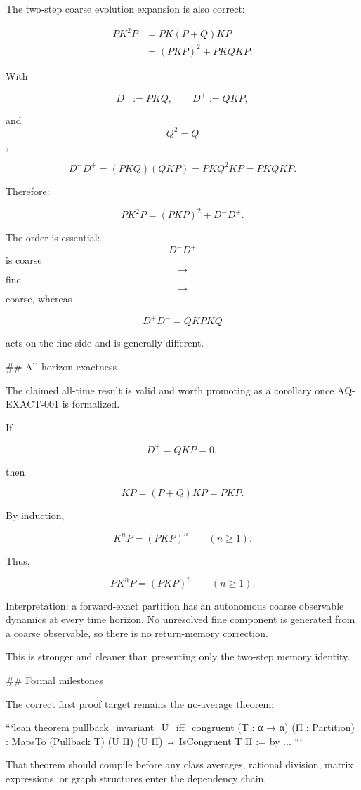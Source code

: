 The two-step coarse evolution expansion is also correct:

$$
\begin{aligned}
PK^2P
&=PK(P+Q)KP\\
&=(PKP)^2+PKQKP.
\end{aligned}
$$

With

$$
D^-:=PKQ,\qquad D^+:=QKP,
$$

and $$Q^2=Q$$,

$$
D^-D^+
=
(PKQ)(QKP)
=
PKQ^2KP
=
PKQKP.
$$

Therefore:

$$
\boxed{
PK^2P=(PKP)^2+D^-D^+.
}
$$

The order is essential: $$D^-D^+$$ is coarse $$\to$$ fine $$\to$$ coarse, whereas

$$
D^+D^-=QKPKQ
$$

acts on the fine side and is generally different.

## All-horizon exactness

The claimed all-time result is valid and worth promoting as a corollary once AQ-EXACT-001 is formalized.

If

$$
D^+=QKP=0,
$$

then

$$
KP=(P+Q)KP=PKP.
$$

By induction,

$$
K^nP=(PKP)^n
\qquad(n\ge 1).
$$

Thus,

$$
\boxed{
PK^nP=(PKP)^n
\qquad(n\ge1).
}
$$

Interpretation: a forward-exact partition has an autonomous coarse observable dynamics at every time horizon. No unresolved fine component is generated from a coarse observable, so there is no return-memory correction.

This is stronger and cleaner than presenting only the two-step memory identity.

## Formal milestones

The correct first proof target remains the no-average theorem:

```lean
theorem pullback_invariant_U_iff_congruent
    (T : α → α) (Π : Partition) :
    MapsTo (Pullback T) (U Π) (U Π) ↔
      IsCongruent T Π := by
  ...
```

That theorem should compile before any class averages, rational division, matrix expressions, or graph structures enter the dependency chain.

